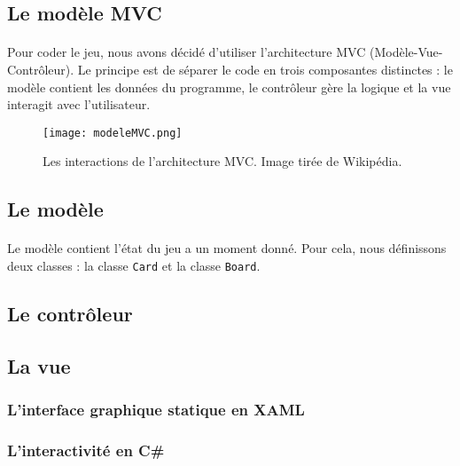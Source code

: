 \subsection{Le modèle MVC}

\paragraph{}Pour coder le jeu, nous avons décidé d'utiliser l'architecture MVC (Modèle-Vue-Contrôleur). Le principe est de séparer le code en trois composantes distinctes : le modèle contient les données du programme, le contrôleur gère la logique et la vue interagit avec l'utilisateur.

\begin{figure}[h]
	\centering
	\texttt{[image: modeleMVC.png]}
	\caption{Les interactions de l'architecture MVC. Image tirée de Wikipédia.}
	\label{fig:MVC}
\end{figure}

\subsection{Le modèle}

\paragraph{}Le modèle contient l'état du jeu a un moment donné. Pour cela, nous définissons deux classes : la classe \lstinline|Card| et la classe \lstinline|Board|. 




\subsection{Le contrôleur}
\subsection{La vue}
\subsubsection{L'interface graphique statique en XAML}
\subsubsection{L'interactivité en C\#}
